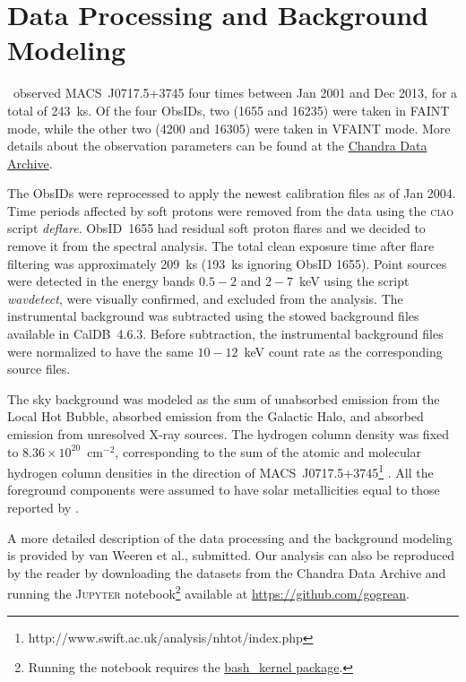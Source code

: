 \section{Data Processing and Background Modeling}
\label{sec:DataAnalysis}

\chandra\ observed MACS~J0717.5+3745 four times between Jan 2001 and Dec 2013, for a total of 243~ks. Of the four ObsIDs, two (1655 and 16235) were taken in FAINT mode, while the other two (4200 and 16305) were taken in VFAINT mode. More details about the observation parameters can be found at the \href{http://cda.harvard.edu/chaser/}{Chandra Data Archive}.

The ObsIDs were reprocessed to apply the newest calibration files as of Jan 2004. Time periods affected by soft protons were removed from the data using the \textsc{ciao} script \emph{deflare}. ObsID~1655 had residual soft proton flares and we decided to remove it from the spectral analysis. The total clean exposure time after flare filtering was approximately 209~ks (193~ks ignoring ObsID 1655). Point sources were detected in the energy bands $0.5-2$ and $2-7$~keV using the script \emph{wavdetect}, were visually confirmed, and excluded from the analysis. The instrumental background was subtracted using the stowed background files available in CalDB~4.6.3. Before subtraction, the instrumental background files were normalized to have the same $10-12$~keV count rate as the corresponding source files. 

The sky background was modeled as the sum of unabsorbed emission from the Local Hot Bubble, absorbed emission from the Galactic Halo, and absorbed emission from unresolved X-ray sources. The hydrogen column density was fixed to $8.36\times 10^{20}$~cm$^{-2}$, corresponding to the sum of the atomic and molecular hydrogen column densities in the direction of MACS~J0717.5+3745\footnote{http://www.swift.ac.uk/analysis/nhtot/index.php} \citep{Kalberla2005, Willingale2013}. All the foreground components were assumed to have solar metallicities equal to those reported by \citet{Feldman1992}. 

A more detailed description of the data processing and the background modeling is provided by van Weeren et al., submitted. Our analysis can also be reproduced by the reader by downloading the datasets from the Chandra Data Archive and running the \textsc{Jupyter} notebook\footnote{Running the notebook requires the \href{https://github.com/takluyver/bash\_kernel}{bash\_kernel package}.} available at \url{https://github.com/gogrean}. 
